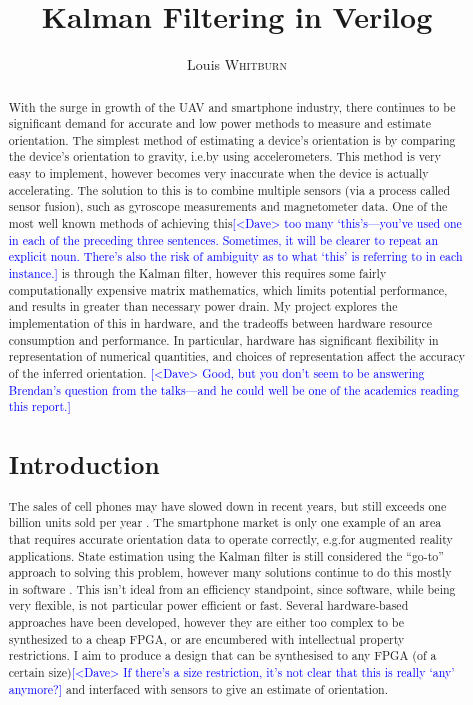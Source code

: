 \documentclass[12pt]{article}
\title{Kalman Filtering in Verilog}
\author{Louis \textsc{Whitburn}}
\newcommand{\note}[2][red]{\textcolor{#1}{#2}}
\newcommand{\notedme}[1]{\note[blue]{[<Dave> #1]}}
\begin{document}
\maketitle

\begin{abstract}

With the surge in growth of the UAV and smartphone industry, there continues to be significant demand for accurate and low power methods to measure and estimate orientation. The simplest method of estimating a device's orientation is by comparing the device's orientation to gravity, i.e.\@ by using accelerometers. This method is very easy to implement, however becomes very inaccurate when the device is actually accelerating. The solution to this is to combine multiple sensors (via a process called sensor fusion), such as gyroscope measurements and magnetometer data. One of the most well known methods of achieving this\notedme{too many `this's---you've used one in each of the preceding three sentences. Sometimes, it will be clearer to repeat an explicit noun. There's also the risk of ambiguity as to what `this' is referring to in each instance.} is through the Kalman filter, however this requires some fairly computationally expensive matrix mathematics, which limits potential performance, and results in greater than necessary power drain. My project explores the implementation of this in hardware, and the tradeoffs between hardware resource consumption and performance. In particular, hardware has significant flexibility in representation of numerical quantities, and choices of representation affect the accuracy of the inferred orientation.
\notedme{Good, but you don't seem to be answering Brendan's question from the talks---and he could well be one of the academics reading this report.}

\section{Introduction}

The sales of cell phones may have slowed down in recent years, but still exceeds one billion units sold per year \cite{Mongardini_2020}. The smartphone market is only one example of an area that requires accurate orientation data to operate correctly, e.g.\@ for augmented reality applications. State estimation using the Kalman filter is still considered the ``go-to'' approach to solving this problem, however many solutions continue to do this mostly in software \cite{ayub_2012}. This isn't ideal from an efficiency standpoint, since software, while being very flexible, is not particular power efficient or fast. Several hardware-based approaches have been developed, however they are either too complex \cite{mills_2016} to be synthesized to a cheap FPGA, or are encumbered with intellectual property restrictions. I aim to produce a design that can be synthesised to any FPGA (of a certain size)\notedme{If there's a size restriction, it's not clear that this is really `any' anymore?} and interfaced with sensors to give an estimate of orientation.


\end{abstract}
\end{document}
